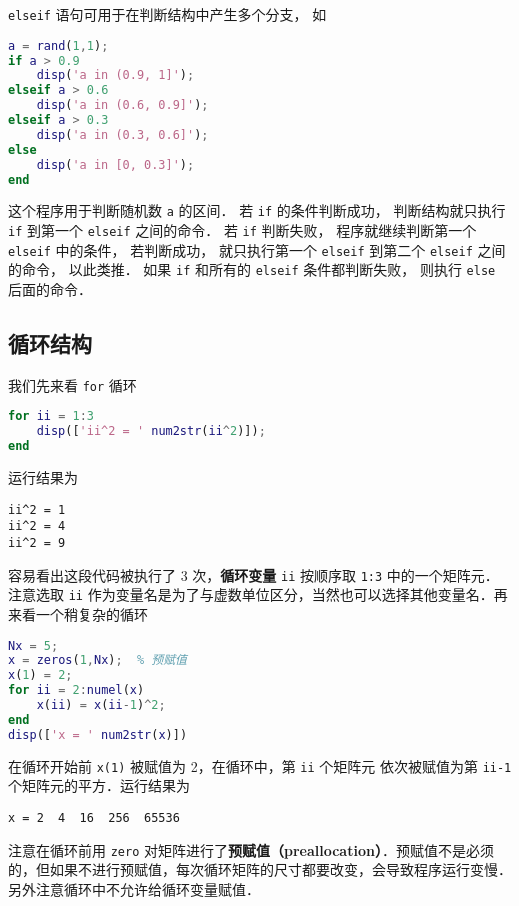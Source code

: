 \lstinline|elseif| 语句可用于在判断结构中产生多个分支， 如

\begin{lstlisting}[language=matlab]
a = rand(1,1);
if a > 0.9
    disp('a in (0.9, 1]');
elseif a > 0.6
    disp('a in (0.6, 0.9]');
elseif a > 0.3
    disp('a in (0.3, 0.6]');
else
    disp('a in [0, 0.3]');
end
\end{lstlisting}

这个程序用于判断随机数 \lstinline|a| 的区间． 若 \lstinline|if| 的条件判断成功， 判断结构就只执行 \lstinline|if| 到第一个 \lstinline|elseif| 之间的命令． 若 \lstinline|if| 判断失败， 程序就继续判断第一个 \lstinline|elseif| 中的条件， 若判断成功， 就只执行第一个 \lstinline|elseif| 到第二个 \lstinline|elseif| 之间的命令， 以此类推． 如果 \lstinline|if| 和所有的 \lstinline|elseif| 条件都判断失败， 则执行 \lstinline|else| 后面的命令．

\subsection{循环结构}
我们先来看 \lstinline|for| 循环

\begin{lstlisting}[language=matlab]
for ii = 1:3
    disp(['ii^2 = ' num2str(ii^2)]);
end
\end{lstlisting}

运行结果为
\begin{lstlisting}[language=matlabC]
ii^2 = 1
ii^2 = 4
ii^2 = 9
\end{lstlisting}
容易看出这段代码被执行了 3 次，\textbf{循环变量} \lstinline|ii| 按顺序取 \lstinline|1:3| 中的一个矩阵元．注意选取 \lstinline|ii| 作为变量名是为了与虚数单位区分，当然也可以选择其他变量名．再来看一个稍复杂的循环

\begin{lstlisting}[language=matlab]
Nx = 5;
x = zeros(1,Nx);  % 预赋值
x(1) = 2;
for ii = 2:numel(x)
    x(ii) = x(ii-1)^2;
end
disp(['x = ' num2str(x)])
\end{lstlisting}

在循环开始前 \lstinline|x(1)| 被赋值为 2，在循环中，第 \lstinline|ii| 个矩阵元 依次被赋值为第 \lstinline|ii-1| 个矩阵元的平方．运行结果为
\begin{lstlisting}[language=matlabC]
x = 2  4  16  256  65536
\end{lstlisting}
注意在循环前用 \lstinline|zero| 对矩阵进行了\textbf{预赋值（preallocation）}．预赋值不是必须的，但如果不进行预赋值，每次循环矩阵的尺寸都要改变，会导致程序运行变慢．另外注意循环中不允许给循环变量赋值．

